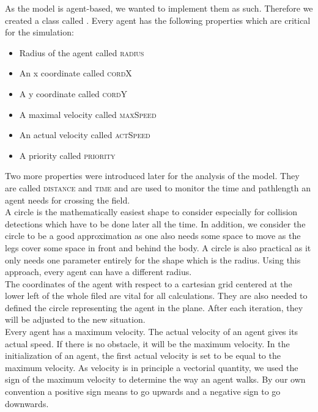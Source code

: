 
As the model is agent-based, we wanted to implement them as such. Therefore we created a class called . Every agent has the following properties which are critical for the simulation:
\begin{itemize}
	\item Radius of the agent called \textsc{radius}
	\item An x coordinate called \textsc{cordX}
	\item A y coordinate called \textsc{cordY}
	\item A maximal velocity called \textsc{maxSpeed}
	\item An actual velocity called \textsc{actSpeed}
	\item A priority called \textsc{priority}
\end{itemize}
\noi Two more properties were introduced later for the analysis of the model. They are called \textsc{distance} and \textsc{time} and are used to monitor the time and pathlength an agent needs for crossing the field.\\

\noi A circle is the mathematically easiest shape to consider especially for collision detections which have to be done later all the time. In addition, we consider the circle to be a good approximation as one also needs some space to move as the legs cover some space in front and behind the body. A circle is also practical as it only needs one parameter entirely for the shape which is the radius. Using this approach, every agent can have a different radius.\\

\noi The coordinates of the agent with respect to a cartesian grid centered at the lower left of the whole filed are vital for all calculations. They are also needed to defined the circle representing the agent in the plane. After each iteration, they will be adjusted to the new situation.\\

\noi Every agent has a maximum velocity. The actual velocity of an agent gives its actual speed. If there is no obstacle, it will be the maximum velocity. In the initialization of an agent, the first actual velocity is set to be equal to the maximum velocity. As velocity is in principle a vectorial quantity, we used the sign of the maximum velocity to determine the way an agent walks. By our own convention a positive sign means to go upwards and a negative sign to go downwards.\\

